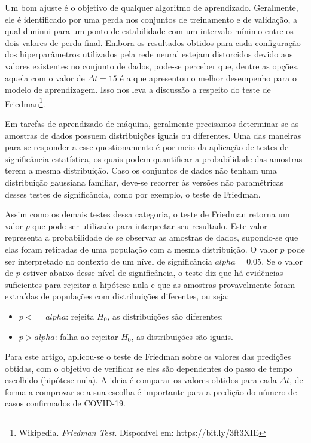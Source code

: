 \documentclass{ieeeaccess}
\begin{document}
Um bom ajuste é o objetivo de qualquer algoritmo de aprendizado. Geralmente, ele é identificado por uma perda nos conjuntos de treinamento e de validação, a qual diminui para um ponto de estabilidade com um intervalo mínimo entre os dois valores de perda final. Embora os resultados obtidos para cada configuração dos hiperparâmetros utilizados pela rede neural estejam distorcidos devido aos valores existentes no conjunto de dados, pode-se perceber que, dentre as opções, aquela com o valor de $\Delta t = 15$ é a que apresentou o melhor desempenho para o modelo de aprendizagem. Isso nos leva a discussão a respeito do teste de Friedman\footnote{Wikipedia. \textit{Friedman Test}. Disponível em: https://bit.ly/3ft3XIE}.

Em tarefas de aprendizado de máquina, geralmente precisamos determinar se as amostras de dados possuem distribuições iguais ou diferentes. Uma das maneiras para se responder a esse questionamento é por meio da aplicação de testes de significância estatística, os quais podem quantificar a probabilidade das amostras terem a mesma distribuição. Caso os conjuntos de dados não tenham uma distribuição gaussiana familiar, deve-se recorrer às versões não paramétricas desses testes de significância, como por exemplo, o teste de Friedman.

Assim como os demais testes dessa categoria, o teste de Friedman retorna um valor $p$ que pode ser utilizado para interpretar seu resultado. Este valor representa a probabilidade de se observar as amostras de dados, supondo-se que elas foram retiradas de uma população com a mesma distribuição. O valor $p$ pode ser interpretado no contexto de um nível de significância $alpha = 0.05$. Se o valor de $p$ estiver abaixo desse nível de significância, o teste diz que há evidências suficientes para rejeitar a hipótese nula e que as amostras provavelmente foram extraídas de populações com distribuições diferentes, ou seja:

\begin{itemize}
	\item $p <= alpha$: rejeita $H_0$, as distribuições são diferentes;
	\item $p > alpha$: falha ao rejeitar $H_0$, as distribuições são iguais.
\end{itemize}

Para este artigo, aplicou-se o teste de Friedman sobre os valores das predições obtidas, com o objetivo de verificar se eles são dependentes do passo de tempo escolhido (hipótese nula). A ideia é comparar os valores obtidos para cada $\Delta t$, de forma a comprovar se a sua escolha é importante para a predição do número de casos confirmados de COVID-19.
\end{document}
